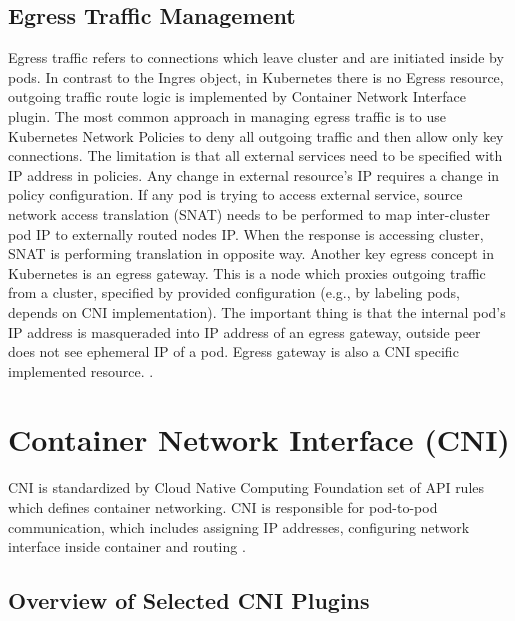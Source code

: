 
\subsection{Egress Traffic Management}
\label{sec:egressTrafficMngmnt}

Egress traffic refers to connections which leave cluster and are initiated inside by pods. In contrast to the Ingres object, in Kubernetes there is no Egress resource, outgoing traffic route logic is implemented by Container Network Interface plugin. The most common approach in managing egress traffic is to use Kubernetes Network Policies to deny all outgoing traffic and then allow only key connections. The limitation is that all external services need to be specified with IP address in policies. Any change in external resource's IP requires a change in policy configuration. If any pod is trying to access external service, source network access translation (SNAT) needs to be performed to map inter-cluster pod IP to externally routed nodes IP. When the response is accessing cluster, SNAT is performing translation in opposite way. Another key egress concept in Kubernetes is an egress gateway. This is a node which proxies outgoing traffic from a cluster, specified by provided configuration (e.g., by labeling pods, depends on CNI implementation). The important thing is that the internal pod's IP address is masqueraded into IP address of an egress gateway, outside peer does not see ephemeral IP of a pod. Egress gateway is also a CNI specific implemented resource. \cite{CalicoEgress} \cite{CiliumEgressGateway}. 



\section{Container Network Interface (CNI)}
\label{sec:cni}
CNI is standardized by Cloud Native Computing Foundation set of API rules which defines container networking. CNI is responsible for pod-to-pod communication, which includes assigning IP addresses, configuring network interface inside container and routing \cite{IBMKubernetesNetworking}. 




\subsection{Overview of Selected CNI Plugins}
\label{sec:cni_overview}


